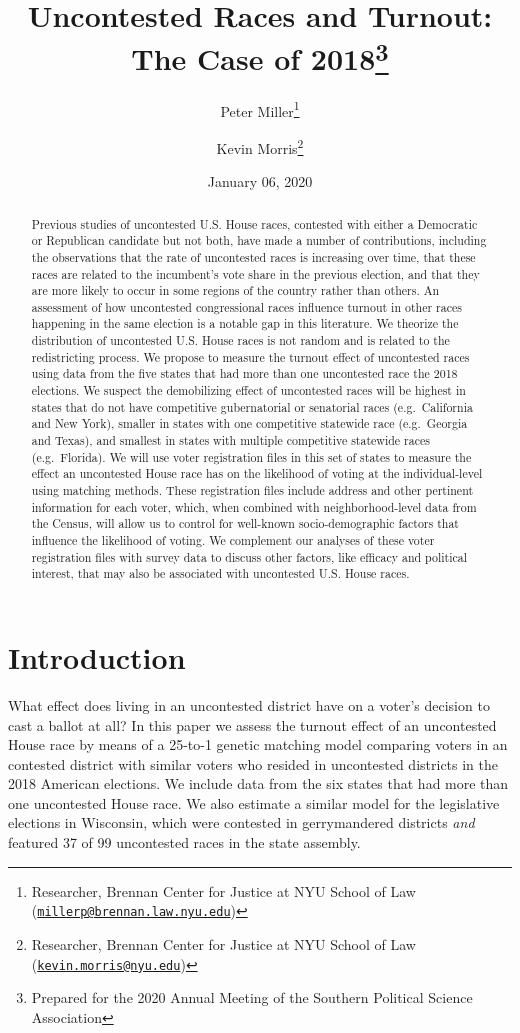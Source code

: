 \documentclass[
  12pt,
]{article}
\title{Uncontested Races and Turnout: The Case of 2018\thanks{Prepared for the 2020 Annual Meeting of the Southern Political Science Association}}
\author{Peter Miller\footnote{Researcher, Brennan Center for Justice at NYU School of Law (\href{mailto:millerp@brennan.law.nyu.edu}{\nolinkurl{millerp@brennan.law.nyu.edu}})} \and Kevin Morris\footnote{Researcher, Brennan Center for Justice at NYU School of Law (\href{mailto:kevin.morris@nyu.edu}{\nolinkurl{kevin.morris@nyu.edu}})}}
\date{January 06, 2020}
\begin{document}
\maketitle
\begin{abstract}
Previous studies of uncontested U.S. House races, contested with either a Democratic or Republican candidate but not both, have made a number of contributions, including the observations that the rate of uncontested races is increasing over time, that these races are related to the incumbent's vote share in the previous election, and that they are more likely to occur in some regions of the country rather than others. An assessment of how uncontested congressional races influence turnout in other races happening in the same election is a notable gap in this literature. We theorize the distribution of uncontested U.S. House races is not random and is related to the redistricting process. We propose to measure the turnout effect of uncontested races using data from the five states that had more than one uncontested race the 2018 elections. We suspect the demobilizing effect of uncontested races will be highest in states that do not have competitive gubernatorial or senatorial races (e.g.~California and New York), smaller in states with one competitive statewide race (e.g.~Georgia and Texas), and smallest in states with multiple competitive statewide races (e.g.~Florida). We will use voter registration files in this set of states to measure the effect an uncontested House race has on the likelihood of voting at the individual-level using matching methods. These registration files include address and other pertinent information for each voter, which, when combined with neighborhood-level data from the Census, will allow us to control for well-known socio-demographic factors that influence the likelihood of voting. We complement our analyses of these voter registration files with survey data to discuss other factors, like efficacy and political interest, that may also be associated with uncontested U.S. House races.
\end{abstract}

\pagebreak

\hypertarget{introduction}{%
\section*{Introduction}\label{introduction}}

What effect does living in an uncontested district have on a voter's decision to cast a ballot at all? In this paper we assess the turnout effect of an uncontested House race by means of a 25-to-1 genetic matching model comparing voters in an contested district with similar voters who resided in uncontested districts in the 2018 American elections. We include data from the six states that had more than one uncontested House race. We also estimate a similar model for the legislative elections in Wisconsin, which were contested in gerrymandered districts \emph{and} featured 37 of 99 uncontested races in the state assembly.
\end{document}
